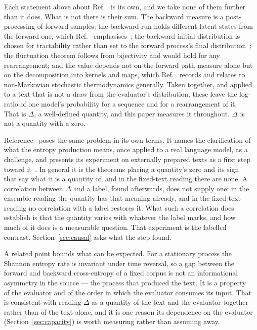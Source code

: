 \documentclass[11pt]{article}
\begin{document}
Each statement above about Ref.~\cite{sagawa2026} is its own, and we take
none of them further than it does.  What is not there is their sum.  The
backward measure is a post-processing of forward samples; the backward run
holds different latent states from the forward one, which
Ref.~\cite{sagawa2026} emphasises~\cite[Secs.~III~A and III~C]{sagawa2026};
the backward initial distribution is chosen for tractability rather than set
to the forward process's final distribution~\cite[Eqs.~(9)--(10)]{sagawa2026};
the fluctuation theorem follows from bijectivity and would hold for any
rearrangement; and the value depends not on the forward path measure alone
but on the decomposition into kernels and maps, which
Ref.~\cite{sagawa2026} records and relates to non-Markovian stochastic
thermodynamics generally.  Taken together, and applied to a text that
is not a draw from the evaluator's distribution, these leave the log-ratio
of one model's
probability for a sequence and for a rearrangement of it.  That is
$\Delta$, a well-defined quantity, and this paper measures it throughout.
$\Delta$ is not a quantity with a zero.

Reference~\cite{sagawa2026} poses the same problem in its own terms.  It
names the clarification of what the entropy production means, once applied
to a real language model, as a challenge, and presents its experiment on
externally prepared texts as a first step toward
it~\cite[Sec.~V~B]{sagawa2026}.  In general it is the theorems placing a
quantity's zero and its sign that say what it is a quantity of, and in the
fixed-text reading there are none.  A correlation between $\Delta$ and a
label, found afterwards, does not supply one: in the ensemble reading the quantity has
that meaning already, and in the fixed-text reading no correlation with a
label restores it.  What such a correlation does establish is that the quantity
varies with whatever the label marks, and how much of it does is a
measurable question.  That experiment is the labelled
contrast.  Section~\ref{sec:causal} asks what the step found.

A related point bounds what can be expected.  For a stationary process the
Shannon entropy rate is invariant under time reversal, so a gap between the
forward and backward cross-entropy of a fixed corpus is not an informational
asymmetry in the source --- the process that produced the text.  It is a
property of the evaluator and of the order in which the evaluator consumes
its input.  That is consistent with reading $\Delta$ as a quantity of the
text and the evaluator together rather than of the text alone, and it is one
reason its dependence on the evaluator (Section~\ref{sec:capacity}) is worth
measuring rather than assuming away.
\end{document}
